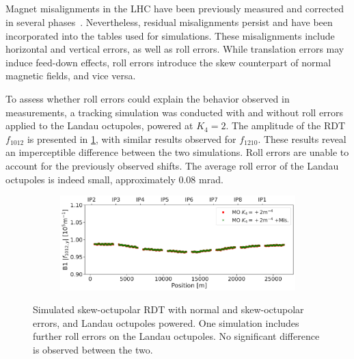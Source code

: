 \FloatBarrier
\subsection{}

Magnet misalignments in the LHC have been previously measured and corrected in several
phases~\cite{missiaen_final_2008}. Nevertheless, residual misalignments persist and have been
incorporated into the tables used for simulations. These misalignments include horizontal and
vertical errors, as well as roll errors. While translation errors may induce feed-down effects,
roll errors introduce the skew counterpart of normal magnetic fields, and vice versa.

To assess whether roll errors could explain the behavior observed in measurements, a tracking
simulation was conducted with and without roll errors applied to the Landau octupoles, powered at 
$K_4 = 2$. The amplitude of the RDT $f_{1012}$ is presented in
\cref{fig:skew_octupolar:sim_misalign}, with similar results observed for $f_{1210}$. These
results reveal an imperceptible difference between the two simulations.
Roll errors are unable to account for the previously observed shifts. The average roll error of
the Landau octupoles is indeed small, approximately $0.08$ mrad.

\begin{figure}[!htb]
    \centering
    \begin{subfigure}{0.8\textwidth}
        \includegraphics[width=\textwidth]{./images/skew_octupoles/f1012_misalign_AMP.pdf}
    \end{subfigure}
    \caption{Simulated skew-octupolar RDT with normal and skew-octupolar errors, and Landau
    octupoles powered. One simulation includes further roll errors on the Landau octupoles. No 
    significant difference is observed between the two.} 
    \label{fig:skew_octupolar:sim_misalign}
\end{figure}



